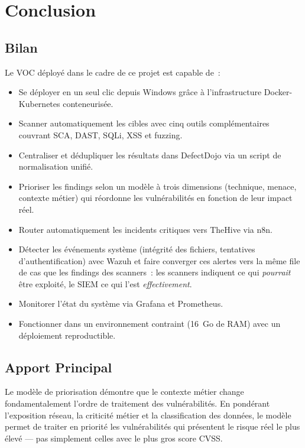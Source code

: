\documentclass[12pt,a4paper]{report}
\begin{document}
\chapter{Conclusion}

\section{Bilan}
Le VOC déployé dans le cadre de ce projet est capable de~:
\begin{itemize}[nosep]
    \item Se déployer en un seul clic depuis Windows grâce à l'infrastructure Docker-Kubernetes conteneurisée.
    \item Scanner automatiquement les cibles avec cinq outils complémentaires couvrant SCA, DAST, SQLi, XSS et fuzzing.
    \item Centraliser et dédupliquer les résultats dans DefectDojo via un script de normalisation unifié.
    \item Prioriser les findings selon un modèle à trois dimensions (technique, menace, contexte métier) qui réordonne les vulnérabilités en fonction de leur impact réel.
    \item Router automatiquement les incidents critiques vers TheHive via n8n.
    \item Détecter les événements système (intégrité des fichiers, tentatives d'authentification) avec Wazuh et faire converger ces alertes vers la même file de cas que les findings des scanners~: les scanners indiquent ce qui \emph{pourrait} être exploité, le SIEM ce qui l'est \emph{effectivement}.
    \item Monitorer l'état du système via Grafana et Prometheus.
    \item Fonctionner dans un environnement contraint (16~Go de RAM) avec un déploiement reproductible.
\end{itemize}

\section{Apport Principal}
Le modèle de priorisation démontre que le contexte métier change fondamentalement l'ordre de traitement des vulnérabilités. En pondérant l'exposition réseau, la criticité métier et la classification des données, le modèle permet de traiter en priorité les vulnérabilités qui présentent le risque réel le plus élevé --- pas simplement celles avec le plus gros score CVSS.
\end{document}
